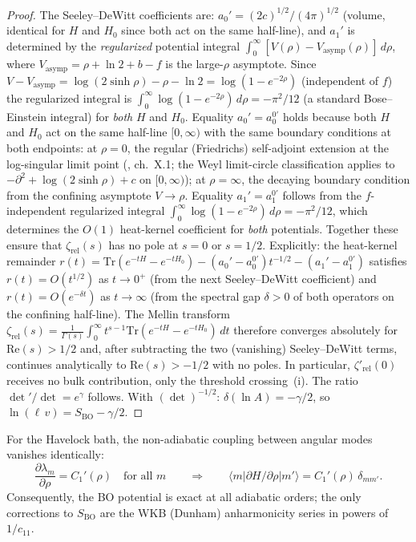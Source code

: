 \begin{proof}
The Seeley--DeWitt coefficients are:
$a_0' = (2c)^{1/2}/(4\pi)^{1/2}$
(volume, identical for $H$ and $H_0$ since both
act on the same half-line),
and $a_1'$ is determined by the \emph{regularized}
potential integral
$\int_0^\infty [V(\rho) - V_{\mathrm{asymp}}(\rho)]\,d\rho$,
where $V_{\mathrm{asymp}} = \rho + \ln 2 + b - f$
is the large-$\rho$ asymptote.
Since $V - V_{\mathrm{asymp}}
= \log(2\sinh\rho) - \rho - \ln 2
= \log(1 - e^{-2\rho})$ (independent of $f$) the
regularized integral is $\int_0^\infty\!\log(1{-}e^{-2\rho})\,
d\rho = -\pi^2/12$
(a standard Bose--Einstein integral)
for \emph{both} $H$ and $H_0$.
Equality $a_0' = a_0^{0\prime}$ holds because both $H$ and
$H_0$ act on the same half-line $[0,\infty)$ with the same
boundary conditions at both endpoints: at $\rho = 0$, the
regular (Friedrichs) self-adjoint extension at the
log-singular limit point
(\citealt{ReedSimon1975II}, ch.~X.1;
the Weyl limit-circle classification applies to
$-\partial^2 + \log(2\sinh\rho) + c$ on $[0,\infty)$);
at $\rho = \infty$, the decaying
boundary condition from the confining asymptote
$V \to \rho$.  Equality $a_1' = a_1^{0\prime}$ follows from the
$f$-independent regularized integral $\int_0^\infty\log(1{-}e^{-2\rho})\,d\rho
= -\pi^2/12$, which determines the $O(1)$ heat-kernel
coefficient for \emph{both} potentials.
Together these ensure that $\zeta_{\mathrm{rel}}(s)$ has
no pole at $s = 0$ or $s = 1/2$.
Explicitly: the heat-kernel remainder
$r(t) = \mathrm{Tr}(e^{-tH} - e^{-tH_0})
- (a_0' - a_0^{0\prime})t^{-1/2}
- (a_1' - a_1^{0\prime})$
satisfies $r(t) = O(t^{1/2})$ as $t \to 0^+$
(from the next Seeley--DeWitt coefficient)
and $r(t) = O(e^{-\delta t})$ as $t \to \infty$
(from the spectral gap $\delta > 0$ of both operators
on the confining half-line).
The Mellin transform
$\zeta_{\mathrm{rel}}(s) = \tfrac{1}{\Gamma(s)}
\int_0^\infty t^{s-1}\mathrm{Tr}(e^{-tH}-e^{-tH_0})\,dt$
therefore converges absolutely for $\mathrm{Re}(s) > 1/2$
and, after subtracting the two (vanishing) Seeley--DeWitt
terms, continues analytically to $\mathrm{Re}(s) > -1/2$
with no poles.
In particular, $\zeta'_{\mathrm{rel}}(0)$ receives no bulk
contribution, only the threshold crossing~(i).
The ratio $\det'/\det = e^\gamma$ follows.
With $(\det)^{-1/2}$:
$\delta(\ln A) = -\gamma/2$,
so $\ln(\ell\,v) = S_{\mathrm{BO}} - \gamma/2$.
\end{proof}

\begin{lemma}
\label{lem:nonadiabatic}
For the Havelock bath, the non-adiabatic coupling between
angular modes vanishes identically:
\begin{equation}\label{eq:no-nonadiabatic}
  \frac{\partial \lambda_m}{\partial\rho}
  = C_1'(\rho) \quad\text{for all } m
  \qquad\Longrightarrow\qquad
  \langle m | \partial H/\partial\rho | m' \rangle
  = C_1'(\rho)\,\delta_{mm'}.
\end{equation}
Consequently, the BO potential is exact at all adiabatic orders;
the only corrections to $S_{\mathrm{BO}}$ are the WKB (Dunham)
anharmonicity series in powers of $1/c_{11}$.
\end{lemma}

